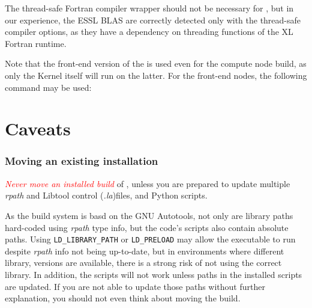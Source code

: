 \documentclass[a4paper,10pt,twoside]{article}
\begin{document}
The thread-safe Fortran compiler wrapper should not be necessary for \CS, but in our
experience, the ESSL BLAS are correctly detected only with the thread-safe
compiler options, as they have a dependency on threading
functions of the XL Fortran runtime.

Note that the front-end version of the \pcs is used even for
the compute node build, as only the Kernel itself will run on the
latter.
For the front-end nodes, the following command may be used:


\section{Caveats}

\subsubsection{Moving an existing installation}

\textcolor{Red}{\emph{Never move an installed build}} of \CS,
unless you are prepared to update multiple \emph{rpath} and
Libtool control (\emph{.la})files, and Python scripts.

As the build system is basd on the GNU Autotools, not only
are library paths hard-coded using \emph{rpath} type info,
but the code's scripts also contain absolute paths.
Using \texttt{LD\_LIBRARY\_PATH} or \texttt{LD\_PRELOAD}
may allow the executable to run despite \emph{rpath} info
not being up-to-date, but in environments where different library,
versions are available, there is a strong risk of not using
the correct library. In addition, the scripts will not work
unless paths in the installed scripts are updated.
If you are not able to update those paths without further
explanation, you should not even think about moving the build.
\end{document}
